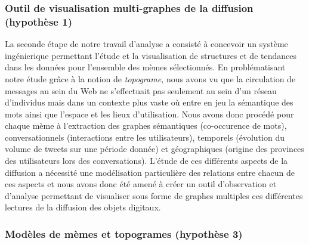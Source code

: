 \subsubsection{Outil de visualisation multi-graphes de la diffusion (hypoth\`ese 1)} 

La seconde \'etape de notre travail d{\textquoteright}analyse a consist\'e \`a concevoir un syst\`eme ing\'enierique permettant l{\textquoteright}\'etude et la visualisation de structures et de tendances dans les donn\'ees pour l{\textquoteright}ensemble des m\`emes s\'electionn\'es. En probl\'ematisant notre \'etude gr\^ace \`a la notion de \textit{topograme,} nous avons vu que la circulation de messages au sein du Web ne s{\textquoteright}effectuait pas seulement au sein d{\textquoteright}un r\'eseau d{\textquoteright}individus mais dans un contexte plus vaste o\`u entre en jeu la s\'emantique des mots ainsi que l{\textquoteright}espace et les lieux d{\textquoteright}utilisation. Nous avons donc proc\'ed\'e pour chaque m\`eme \`a l{\textquoteright}extraction des graphes s\'emantiques (co-occurence de mots), conversationnels (interactions entre les utilisateurs), temporels (\'evolution du volume de tweets sur une p\'eriode donn\'ee) et g\'eographiques (origine des provinces des utilisateurs lors des conversations). L{\textquoteright}\'etude de ces diff\'erents aspects de la diffusion a n\'ecessit\'e une mod\'elisation particuli\`ere des relations entre chacun de ces aspects et nous avons donc \'et\'e amen\'e \`a cr\'eer un outil d{\textquoteright}observation et d{\textquoteright}analyse permettant de visualiser sous forme de graphes multiples ces diff\'erentes lectures de la diffusion des objets digitaux.  
  
\subsubsection{Mod\`eles de m\`emes et topogrames (hypoth\`ese 3)}
 
